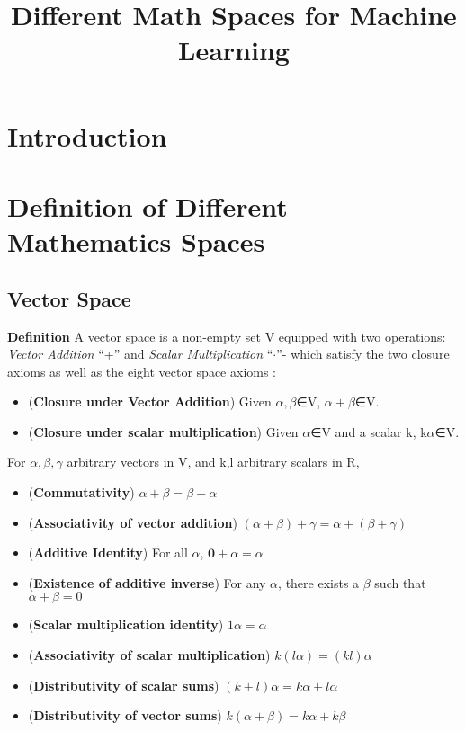 \documentclass[UTF8]{article} %
\title{Different Math Spaces for Machine Learning}
\date{}
\begin{document}
\maketitle

\section{Introduction}

\section{Definition of Different Mathematics Spaces}


\subsection{Vector Space}
\textbf{Definition} A vector space is a non-empty set V equipped with two operations: \textit{Vector Addition} “+” and \textit{Scalar Multiplication} “$\cdot$”- which satisfy the two closure axioms  as well as the eight vector space axioms :\\
\begin{itemize}
    \item (\textbf{Closure under Vector Addition}) Given $\alpha,\beta$∈V, $\alpha + \beta$∈V.
    \item (\textbf{Closure under scalar multiplication}) Given $\alpha$∈V and a scalar k, k$\alpha$∈V.
\end{itemize}


For $\alpha,\beta,\gamma$ arbitrary vectors in V, and k,l arbitrary scalars in R,
\begin{itemize}
    \item (\textbf{Commutativity}) $\alpha + \beta = \beta + \alpha$
    \item (\textbf{Associativity of vector addition}) $(\alpha + \beta) + \gamma = \alpha + (\beta + \gamma)$
    \item (\textbf{Additive Identity}) For all $\alpha$, $\textbf{0} + \alpha = \alpha$
    \item (\textbf{Existence of additive inverse}) For any $\alpha$, there exists a $\beta$ such that $\alpha + \beta = 0$
    \item (\textbf{Scalar multiplication identity}) $1\alpha = \alpha$
    \item (\textbf{Associativity of scalar multiplication}) $k(l\alpha) = (kl)\alpha$
    \item (\textbf{Distributivity of scalar sums}) $(k+l)\alpha = k\alpha + l\alpha $
    \item (\textbf{Distributivity of vector sums}) $k(\alpha + \beta) = k\alpha + k\beta$

\end{itemize}
\end{document}
